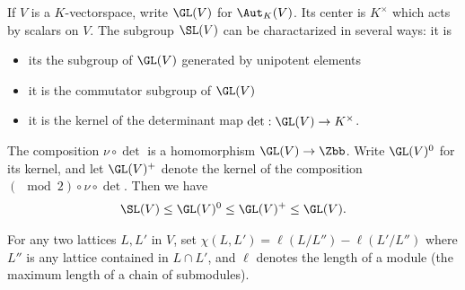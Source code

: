 \documentclass{article}
\begin{document}
If $V$ is a $K$-vectorspace, write $\GL(V)$ for $\Aut_K(V)$. Its center is $K^\times$ which acts by scalars on $V$. The subgroup $\SL(V)$ can be charactarized in several ways: it is
\begin{itemize}
    \item its the subgroup of $\GL(V)$ generated by unipotent elements
    \item it is the commutator subgroup of $\GL(V)$
    \item it is the kernel of the determinant map $\det:\GL(V) \to K^\times$.
\end{itemize}

The composition $\nu \circ \det $ is a homomorphism $\GL(V) \to \Zbb$. Write $\GL(V)^0$ for its kernel, and let $\GL(V)^+$ denote the kernel of the composition $(\mod 2) \circ \nu \circ \det$. Then we have
\begin{align*}
    \SL(V) \leq \GL(V)^0\leq \GL(V)^{+} \leq \GL(V).
\end{align*}

For any two lattices $L,L'$ in $V$, set $\chi(L,L')= \ell(L/L'')- \ell (L'/L'')$ where $L''$ is any lattice contained in $L\cap L'$, and $\ell$ denotes the length of a module (the maximum length of a chain of submodules).
\end{document}
